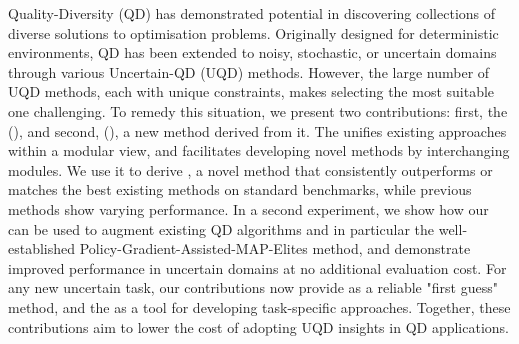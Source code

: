 Quality-Diversity (QD) has demonstrated potential in discovering collections of diverse solutions to optimisation problems. Originally designed for deterministic environments, QD has been extended to noisy, stochastic, or uncertain domains through various Uncertain-QD (UQD) methods.
However, the large number of UQD methods, each with unique constraints, makes selecting the most suitable one challenging.
To remedy this situation, we present two contributions: first, the \Longframework{} (\framework{}), and second, \Longname{} (\name{}), a new method derived from it.
The \framework{} unifies existing approaches within a modular view, and facilitates developing novel methods by interchanging modules. 
We use it to derive \name{}, a novel method that consistently outperforms or matches the best existing methods on standard benchmarks, while previous methods show varying performance.
In a second experiment, we show how our \framework{} can be used to augment existing QD algorithms and in particular the well-established Policy-Gradient-Assisted-MAP-Elites method, and demonstrate improved performance in uncertain domains at no additional evaluation cost. 
For any new uncertain task, our contributions now provide \name{} as a reliable "first guess" method, and the \framework{} as a tool for developing task-specific approaches.
Together, these contributions aim to lower the cost of adopting UQD insights in QD applications.

